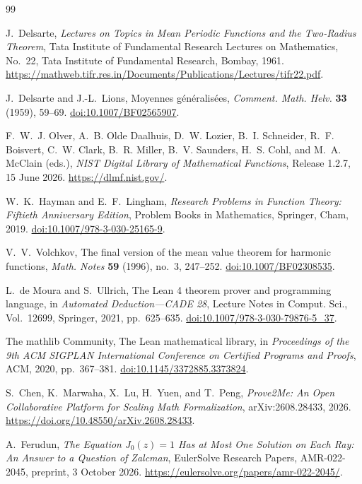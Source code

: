 \documentclass[11pt]{amsart}
\numberwithin{equation}{section}
\theoremstyle{definition}
\theoremstyle{remark}
\begin{document}
\begin{thebibliography}{99}
\raggedright

J.~Delsarte,
\emph{Lectures on Topics in Mean Periodic Functions and the Two-Radius Theorem},
Tata Institute of Fundamental Research Lectures on Mathematics, No.~22,
Tata Institute of Fundamental Research, Bombay, 1961.
\url{https://mathweb.tifr.res.in/Documents/Publications/Lectures/tifr22.pdf}.

J.~Delsarte and J.-L.~Lions,
Moyennes g\'en\'eralis\'ees,
\emph{Comment. Math. Helv.} \textbf{33} (1959), 59--69.
\href{https://doi.org/10.1007/BF02565907}{doi:10.1007/BF02565907}.

F.~W.~J. Olver, A.~B. Olde Daalhuis, D.~W. Lozier, B.~I. Schneider,
R.~F. Boisvert, C.~W. Clark, B.~R. Miller, B.~V. Saunders, H.~S. Cohl,
and M.~A. McClain (eds.),
\emph{NIST Digital Library of Mathematical Functions}, Release 1.2.7,
15 June 2026.
\url{https://dlmf.nist.gov/}.

W.~K.~Hayman and E.~F.~Lingham,
\emph{Research Problems in Function Theory: Fiftieth Anniversary Edition},
Problem Books in Mathematics, Springer, Cham, 2019.
\href{https://doi.org/10.1007/978-3-030-25165-9}{doi:10.1007/978-3-030-25165-9}.

V.~V.~Volchkov,
The final version of the mean value theorem for harmonic functions,
\emph{Math. Notes} \textbf{59} (1996), no.~3, 247--252.
\href{https://doi.org/10.1007/BF02308535}{doi:10.1007/BF02308535}.

L.~de Moura and S.~Ullrich,
The Lean 4 theorem prover and programming language,
in \emph{Automated Deduction---CADE 28},
Lecture Notes in Comput. Sci., Vol.~12699, Springer, 2021, pp.~625--635.
\href{https://doi.org/10.1007/978-3-030-79876-5_37}{doi:10.1007/978-3-030-79876-5\_37}.

The mathlib Community,
The Lean mathematical library,
in \emph{Proceedings of the 9th ACM SIGPLAN International Conference on
Certified Programs and Proofs}, ACM, 2020, pp.~367--381.
\href{https://doi.org/10.1145/3372885.3373824}{doi:10.1145/3372885.3373824}.

S.~Chen, K.~Marwaha, X.~Lu, H.~Yuen, and T.~Peng,
\emph{Prove2Me: An Open Collaborative Platform for Scaling Math Formalization},
arXiv:2608.28433, 2026.
\url{https://doi.org/10.48550/arXiv.2608.28433}.

A.~Ferudun,
\emph{The Equation $J_0(z)=1$ Has at Most One Solution on Each Ray:
An Answer to a Question of Zalcman},
EulerSolve Research Papers, AMR-022-2045, preprint,
3 October 2026.
\url{https://eulersolve.org/papers/amr-022-2045/}.

\end{thebibliography}
\end{document}
